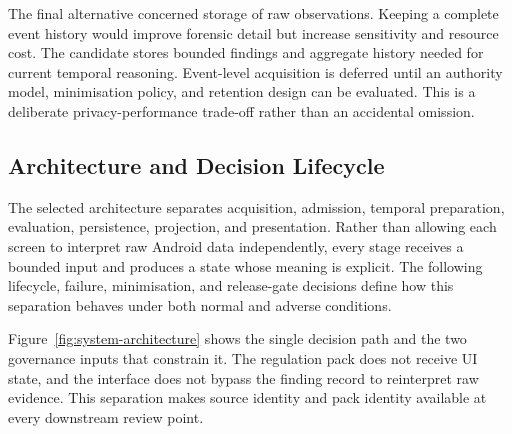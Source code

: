 The final alternative concerned storage of raw observations. Keeping a complete event history would improve forensic detail but increase sensitivity and resource cost. The candidate stores bounded findings and aggregate history needed for current temporal reasoning. Event-level acquisition is deferred until an authority model, minimisation policy, and retention design can be evaluated. This is a deliberate privacy-performance trade-off rather than an accidental omission.

\subsection{Architecture and Decision Lifecycle}

The selected architecture separates acquisition, admission, temporal preparation, evaluation, persistence, projection, and presentation. Rather than allowing each screen to interpret raw Android data independently, every stage receives a bounded input and produces a state whose meaning is explicit. The following lifecycle, failure, minimisation, and release-gate decisions define how this separation behaves under both normal and adverse conditions.

Figure~\ref{fig:system-architecture} shows the single decision path and the two governance inputs that constrain it. The regulation pack does not receive UI state, and the interface does not bypass the finding record to reinterpret raw evidence. This separation makes source identity and pack identity available at every downstream review point.

